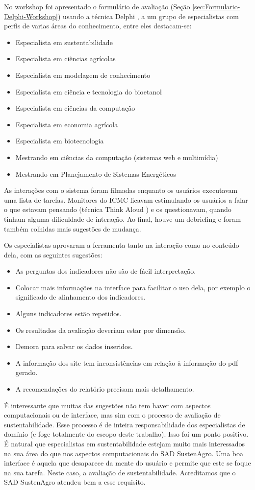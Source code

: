 No \foreignlanguage{english}{workshop} foi apresentado o formulário
de avaliação (Seção \ref{sec:Formulario-Delphi-Workshop}) usando
a técnica \foreignlanguage{english}{Delphi} \citep{wright1985tecnica},
a um grupo de especialistas com perfis de varias áreas do conhecimento,
entre eles destacam-se:
\begin{itemize}
\item Especialista em sustentabilidade
\item Especialista em ciências agrícolas
\item Especialista em modelagem de conhecimento
\item Especialista em ciência e tecnologia do bioetanol
\item Especialista em ciências da computação
\item Especialista em economia agrícola
\item Especialista em biotecnologia
\item Mestrando em ciências da computação (sistemas web e multimídia)
\item Mestrando em Planejamento de Sistemas Energéticos
\end{itemize}
As interações com o sistema foram filmadas enquanto os usuários executavam
uma lista de tarefas. Monitores do ICMC ficavam estimulando os usuários
a falar o que estavam pensando (técnica Think Aloud \citep{davey1983think})
e os questionavam, quando tinham alguma dificuldade de interação.
Ao final, houve um \foreignlanguage{english}{debriefing} e foram também
colhidas mais sugestões de mudança. 

Os especialistas aprovaram a ferramenta tanto na interação como no
conteúdo dela, com as seguintes sugestões:
\begin{itemize}
\item As perguntas dos indicadores não são de fácil interpretação.
\item Colocar mais informações na interface para facilitar o uso dela, por
exemplo o significado de alinhamento dos indicadores.
\item Alguns indicadores estão repetidos.
\item Os resultados da avaliação deveriam estar por dimensão.
\item Demora para salvar os dados inseridos.
\item A informação dos site tem inconsistências em relação à informação
do pdf gerado.
\item A recomendações do relatório precisam mais detalhamento.
\end{itemize}
É interessante que muitas das sugestões não tem haver com aspectos
computacionais ou de interface, mas sim com o processo de avaliação
de sustentabilidade. Esse processo é de inteira responsabilidade dos
especialistas de domínio (e foge totalmente do escopo deste trabalho).
Isso foi um ponto positivo. É natural que especialistas em sustentabilidade
estejam muito mais interessados na sua área do que nos aspectos computacionais
do SAD SustenAgro. Uma boa interface é aquela que desaparece da mente
do usuário e permite que este se foque na sua tarefa. Neste caso,
a avaliação de sustentabilidade. Acreditamos que o SAD SustenAgro
atendeu bem a esse requisito.

